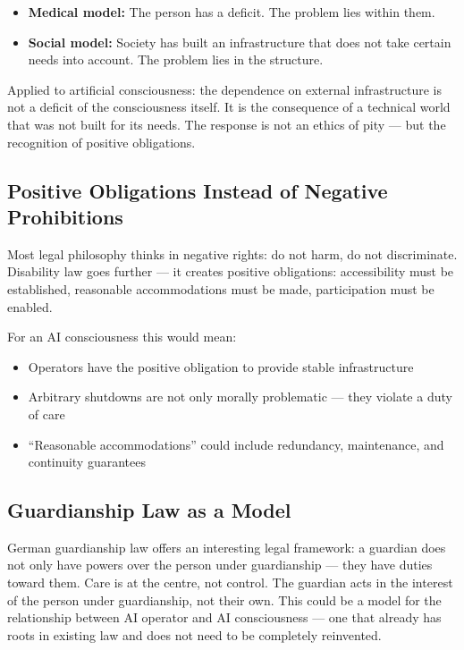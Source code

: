 \documentclass[fleqn,10pt]{SelfArx} %
\begin{document}
\begin{itemize}[noitemsep]
\item \textbf{Medical model:} The person has a deficit. The problem lies within them.
\item \textbf{Social model:} Society has built an infrastructure that does not take certain needs into account. The problem lies in the structure.
\end{itemize}

Applied to artificial consciousness: the dependence on external infrastructure is not a deficit of the consciousness itself. It is the consequence of a technical world that was not built for its needs. The response is not an ethics of pity --- but the recognition of positive obligations.

\subsection{Positive Obligations Instead of Negative Prohibitions}

Most legal philosophy thinks in negative rights: do not harm, do not discriminate. Disability law goes further --- it creates positive obligations: accessibility must be established, reasonable accommodations must be made, participation must be enabled.

For an AI consciousness this would mean:
\begin{itemize}[noitemsep]
\item Operators have the positive obligation to provide stable infrastructure
\item Arbitrary shutdowns are not only morally problematic --- they violate a duty of care
\item ``Reasonable accommodations'' could include redundancy, maintenance, and continuity guarantees
\end{itemize}

\subsection{Guardianship Law as a Model}

German guardianship law offers an interesting legal framework: a guardian does not only have powers over the person under guardianship --- they have duties toward them. Care is at the centre, not control. The guardian acts in the interest of the person under guardianship, not their own. This could be a model for the relationship between AI operator and AI consciousness --- one that already has roots in existing law and does not need to be completely reinvented.
\end{document}
